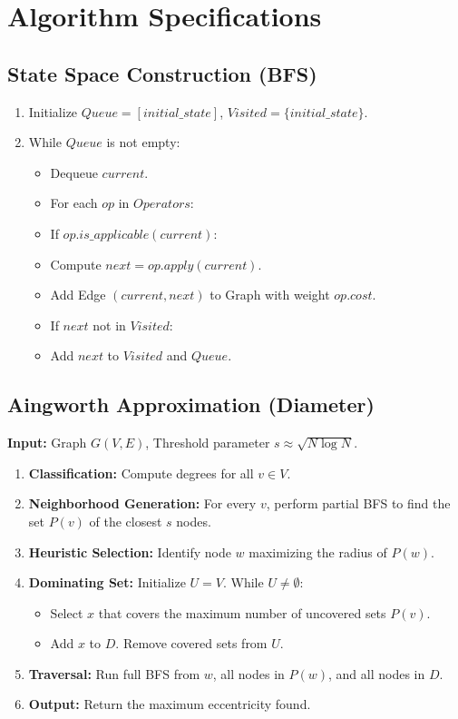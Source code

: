 \documentclass[12pt,a4paper]{report}
\begin{document}
\section{Algorithm Specifications}

\subsection{State Space Construction (BFS)}
\begin{enumerate}
    \item Initialize $Queue = [initial\_state]$, $Visited = \{initial\_state\}$.
    \item While $Queue$ is not empty:
    \begin{itemize}
        \item Dequeue $current$.
        \item For each $op$ in $Operators$:
        \item If $op.is\_applicable(current)$:
        \item Compute $next = op.apply(current)$.
        \item Add Edge $(current, next)$ to Graph with weight $op.cost$.
        \item If $next$ not in $Visited$:
        \item Add $next$ to $Visited$ and $Queue$.
    \end{itemize}
\end{enumerate}

\subsection{Aingworth Approximation (Diameter)}
\textbf{Input:} Graph $G(V, E)$, Threshold parameter $s \approx \sqrt{N \log N}$.
\begin{enumerate}
    \item \textbf{Classification:} Compute degrees for all $v \in V$.
    \item \textbf{Neighborhood Generation:} For every $v$, perform partial BFS to find the set $P(v)$ of the closest $s$ nodes.
    \item \textbf{Heuristic Selection:} Identify node $w$ maximizing the radius of $P(w)$.
    \item \textbf{Dominating Set:} Initialize $U = V$. While $U \neq \emptyset$:
    \begin{itemize}
        \item Select $x$ that covers the maximum number of uncovered sets $P(v)$.
        \item Add $x$ to $D$. Remove covered sets from $U$.
    \end{itemize}
    \item \textbf{Traversal:} Run full BFS from $w$, all nodes in $P(w)$, and all nodes in $D$.
    \item \textbf{Output:} Return the maximum eccentricity found.
\end{enumerate}
\end{document}
